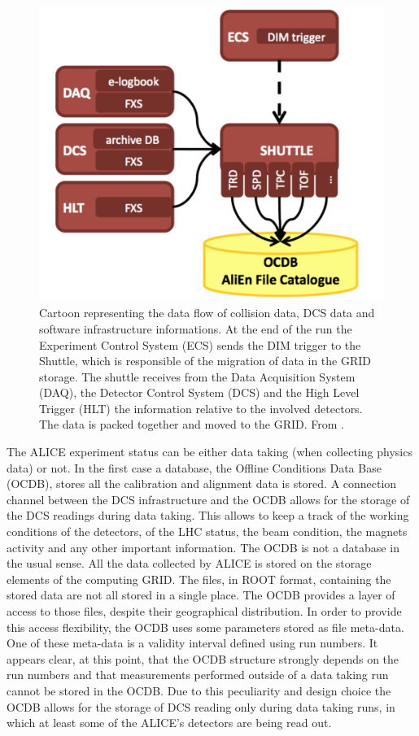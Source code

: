 \begin{figure}[!t]
\begin{center}
\includegraphics[width=0.7\linewidth]{Chapters/Performance/Figs/OCDB.png}
\caption{Cartoon representing the data flow of collision data, DCS data and software infrastructure informations. At the end of the run the Experiment Control System (ECS) sends the DIM trigger to the Shuttle, which is responsible of the migration of data in the GRID storage. The shuttle receives from the Data Acquisition System (DAQ), the Detector Control System (DCS) and the High Level Trigger (HLT) the information relative to the involved detectors. The data is packed together and moved to the GRID. From \cite{Zampolli:2010zz}.}
\label{fig:shuttle}
\end{center}
\end{figure}

The ALICE experiment status can be either data taking (when collecting physics data) or not.
In the first case a database, the Offline Conditions Data Base (OCDB), stores all the calibration and alignment data is stored.
A connection channel between the DCS infrastructure and the OCDB allows for the storage of the DCS readings during data taking.
This allows to keep a track of the working conditions of the detectors, of the LHC status, the beam condition, the magnets activity and any other important information.
The OCDB is not a database in the usual sense.
All the data collected by ALICE is stored on the storage elements of the computing GRID.
The files, in ROOT format, containing the stored data are not all stored in a single place.
The OCDB provides a layer of access to those files, despite their geographical distribution.
In order to provide this access flexibility, the OCDB uses some parameters stored as file meta-data.
One of these meta-data is a validity interval defined using run numbers.
It appears clear, at this point, that the OCDB structure strongly depends on the run numbers and that measurements performed outside of a data taking run cannot be stored in the OCDB.
Due to this peculiarity and design choice the OCDB allows for the storage of DCS reading only during data taking runs, in which at least some of the ALICE's detectors are being read out.



